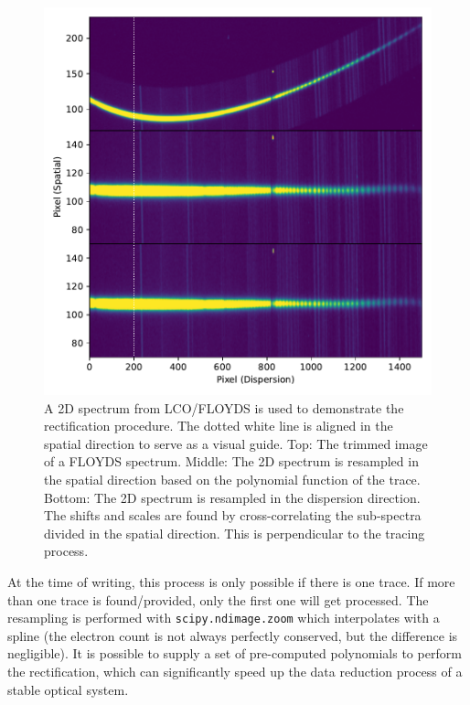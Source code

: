 \documentclass[fleqn,usenatbib]{mnras}
\begin{document}
\begin{figure}
    \centering
    \includegraphics[width=\columnwidth]{fig_02_rectification.pdf}
    \caption{A 2D spectrum from LCO/FLOYDS is used to
    demonstrate the rectification procedure. The dotted white line
    is aligned in the spatial direction to serve as a visual guide.
    Top: The trimmed image of a FLOYDS spectrum. Middle: The 2D
    spectrum is resampled in the spatial direction based on the
    polynomial function of the trace. Bottom: The 2D spectrum is
    resampled in the dispersion direction. The shifts and scales
    are found by cross-correlating the sub-spectra divided in the
    spatial direction. This is perpendicular to the tracing process.}
    \label{fig:rectify}
\end{figure}

At the time of writing, this process is only possible if there is
one trace. If more than one trace is found/provided, only the first
one will get processed. The resampling is performed with
\texttt{scipy.ndimage.zoom} which interpolates with a spline (the
electron count is not always perfectly conserved, but the difference
is negligible). It is possible to supply a set of pre-computed polynomials to perform
the rectification, which can significantly speed up the data reduction
process of a stable optical system.
\end{document}
